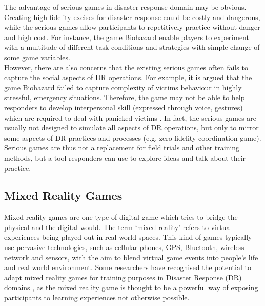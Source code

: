 The advantage of serious games in disaster response domain may be obvious. Creating high fidelity excises for disaster response could be costly and dangerous, while the serious games allow participants to repetitively practice without danger and high cost. For instance, the game Biohazard\cite{Susi2007} enable players to experiment with a multitude of different task conditions and strategies with simple change of some game variables.\\

However, there are also concerns that the existing serious games often fails to capture the social aspects of DR operations. For example, it is argued that the game Biohazard failed to capture complexity of victims behaviour in highly stressful, emergency situations. Therefore, the game may not be able to help responders to develop interpersonal skill (expressed through voice, gestures) which are required to deal with panicked victims \cite{Susi2007}. In fact, the serious games are usually not designed to simulate all aspects of DR operations, but only to mirror some aspects of DR practices and processes (e.g. zero fidelity coordination game). Serious games are thus not a replacement for field trials and other training methods, but a tool responders can use to explore ideas and talk about their practice.\\


\subsection{Mixed Reality Games}
Mixed-reality games are one type of digital game which tries to bridge the physical and the digital \cite{Benford2005} would. The term `mixed reality' refers to virtual experiences being played out in real-world spaces. This kind of games typically use pervasive technologies, such as cellular phones, GPS, Bluetooth, wireless network and sensors, with the aim to blend virtual game events into people's life and real world environment. Some researchers have recognised the potential to adapt mixed reality games for training purposes in Disaster Response (DR) domains \cite{Fischer2012}, as the mixed reality game is thought to be a powerful way of exposing participants to learning experiences not otherwise possible. \\

